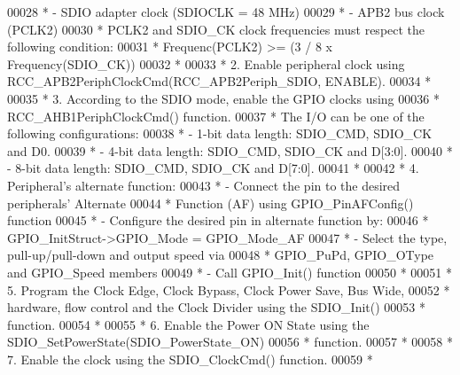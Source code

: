 \begin{DoxyCode}
00028 \textcolor{comment}{  *              - SDIO adapter clock (SDIOCLK = 48 MHz)}
00029 \textcolor{comment}{  *              - APB2 bus clock (PCLK2)}
00030 \textcolor{comment}{  *          PCLK2 and SDIO\_CK clock frequencies must respect the following condition:}
00031 \textcolor{comment}{  *                   Frequenc(PCLK2) >= (3 / 8 x Frequency(SDIO\_CK))}
00032 \textcolor{comment}{  *}
00033 \textcolor{comment}{  *          2. Enable peripheral clock using RCC\_APB2PeriphClockCmd(RCC\_APB2Periph\_SDIO, ENABLE).}
00034 \textcolor{comment}{  *}
00035 \textcolor{comment}{  *          3.  According to the SDIO mode, enable the GPIO clocks using }
00036 \textcolor{comment}{  *              RCC\_AHB1PeriphClockCmd() function. }
00037 \textcolor{comment}{  *              The I/O can be one of the following configurations:}
00038 \textcolor{comment}{  *                 - 1-bit data length: SDIO\_CMD, SDIO\_CK and D0.}
00039 \textcolor{comment}{  *                 - 4-bit data length: SDIO\_CMD, SDIO\_CK and D[3:0].}
00040 \textcolor{comment}{  *                 - 8-bit data length: SDIO\_CMD, SDIO\_CK and D[7:0].      }
00041 \textcolor{comment}{  *}
00042 \textcolor{comment}{  *          4. Peripheral's alternate function: }
00043 \textcolor{comment}{  *                 - Connect the pin to the desired peripherals' Alternate }
00044 \textcolor{comment}{  *                   Function (AF) using GPIO\_PinAFConfig() function}
00045 \textcolor{comment}{  *                 - Configure the desired pin in alternate function by:}
00046 \textcolor{comment}{  *                   GPIO\_InitStruct->GPIO\_Mode = GPIO\_Mode\_AF}
00047 \textcolor{comment}{  *                 - Select the type, pull-up/pull-down and output speed via }
00048 \textcolor{comment}{  *                   GPIO\_PuPd, GPIO\_OType and GPIO\_Speed members}
00049 \textcolor{comment}{  *                 - Call GPIO\_Init() function}
00050 \textcolor{comment}{  *}
00051 \textcolor{comment}{  *          5. Program the Clock Edge, Clock Bypass, Clock Power Save, Bus Wide, }
00052 \textcolor{comment}{  *             hardware, flow control and the Clock Divider using the SDIO\_Init()}
00053 \textcolor{comment}{  *             function.}
00054 \textcolor{comment}{  *}
00055 \textcolor{comment}{  *          6. Enable the Power ON State using the SDIO\_SetPowerState(SDIO\_PowerState\_ON) }
00056 \textcolor{comment}{  *             function.}
00057 \textcolor{comment}{  *              }
00058 \textcolor{comment}{  *          7. Enable the clock using the SDIO\_ClockCmd() function.}
00059 \textcolor{comment}{  *}

\end{DoxyCode}
